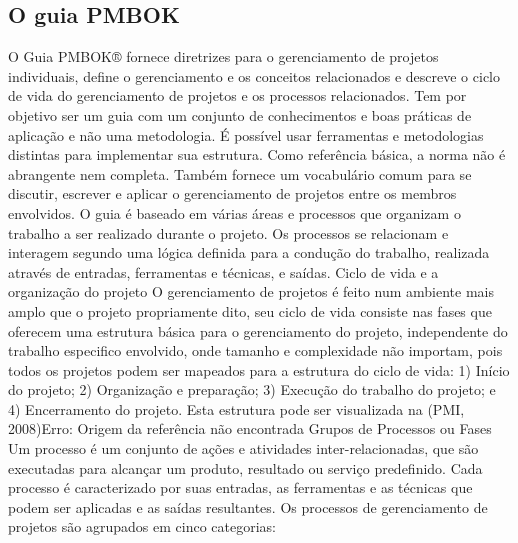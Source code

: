 \subsection{O guia PMBOK}
O Guia PMBOK® fornece diretrizes para o gerenciamento de projetos individuais, define o gerenciamento e os conceitos relacionados e descreve o ciclo de vida do gerenciamento de projetos e os processos relacionados. Tem por objetivo ser um guia com um conjunto de conhecimentos e boas práticas de aplicação e não uma metodologia. É possível usar ferramentas e metodologias distintas para implementar sua estrutura. Como referência básica, a norma não é abrangente nem completa. Também fornece um vocabulário comum para se discutir, escrever e aplicar o gerenciamento de projetos entre os membros envolvidos. 
O guia é baseado em várias áreas e processos que organizam o trabalho a ser realizado durante o projeto. Os processos se relacionam e interagem segundo uma lógica definida para a condução do trabalho, realizada através de entradas, ferramentas e técnicas, e saídas.
Ciclo de vida e a organização do projeto 
O gerenciamento de projetos é feito num ambiente mais amplo que o projeto propriamente dito, seu ciclo de vida consiste nas fases que oferecem uma estrutura básica para o gerenciamento do projeto, independente do trabalho especifico envolvido, onde tamanho e complexidade não importam, pois todos os projetos podem ser mapeados para a estrutura do ciclo de vida: 1) Início do projeto; 2) Organização e preparação; 3) Execução do trabalho do projeto; e 4) Encerramento do projeto.  Esta estrutura pode ser visualizada na (PMI, 2008)Erro: Origem da referência não encontrada
Grupos de Processos ou Fases
Um processo é um conjunto de ações e atividades inter-relacionadas, que são executadas para alcançar um produto, resultado ou serviço predefinido. Cada processo é caracterizado por suas entradas, as ferramentas e as técnicas que podem ser aplicadas e as saídas resultantes.
Os processos de gerenciamento de projetos são agrupados em cinco categorias:

